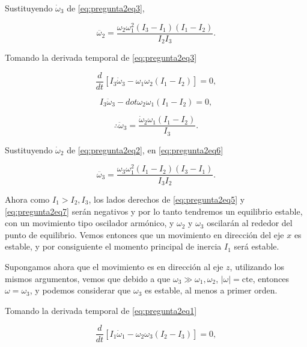 \documentclass[a4paper,10pt]{article}
\numberwithin{equation}{section}
\begin{document}
Sustituyendo $\dot{\omega}_3$ de \eqref{eq:pregunta2eq3}, 

\begin{equation}
 \ddot{\omega_2} = \frac{\omega_2\omega_1^2(I_3 - I_1)(I_1 - I_2)}{I_2I_3}.
 \label{eq:pregunta2eq5}
\end{equation}

Tomando la derivada temporal de \eqref{eq:pregunta2eq3} 

\begin{equation}
 \frac{d}{dt}\left[I_3\dot{\omega}_3 - \omega_1\omega_2(I_1 - I_2) \right] = 0,
\end{equation}

\begin{equation}
 I_3\ddot{\omega}_3 - dot{\omega}_2\omega_1(I_1 - I_2) = 0,
\end{equation}

\begin{equation}
 \therefore \ddot{\omega}_3 = \frac{\dot{\omega}_2\omega_1(I_1-I_2)}{I_3}.
 \label{eq:pregunta2eq6}
\end{equation}

Sustituyendo $\dot{\omega}_2$ de \eqref{eq:pregunta2eq2}, en \eqref{eq:pregunta2eq6}

\begin{equation}
 \ddot{\omega_3} = \frac{\omega_3\omega_1^2(I_1 - I_2)(I_3 - I_1)}{I_3I_2}.
 \label{eq:pregunta2eq7}
\end{equation}

Ahora como $I_1 > I_2,I_3$, los lados derechos de \eqref{eq:pregunta2eq5} y 
\eqref{eq:pregunta2eq7} serán negativos y por lo tanto tendremos un equilibrio 
estable, con un movimiento tipo oscilador armónico, y $\omega_2$ y $\omega_3$ 
oscilarán al rededor del punto de equilibrio. Vemos entonces que un movimiento 
en dirección del eje $x$ es estable, y por consiguiente el momento principal 
de inercia $I_1$ será estable. 

\vspace{.3cm}

Supongamos ahora que el movimiento es en dirección al eje $z$, utilizando los 
mismos argumentos, vemos que debido a que $\omega_3 \gg \omega_1,\omega_2$, 
$|\omega| = \text{cte}$, entonces $\omega = \omega_3$, y podemos considerar 
que $\omega_3$ es estable, al menos a primer orden. 

Tomando la derivada temporal de \eqref{eq:pregunta2eq1} 

\begin{equation}
 \frac{d}{dt}\left[I_1\dot{\omega}_1 - \omega_2\omega_3(I_2 - I_3) \right] = 0,
\end{equation}
\end{document}
